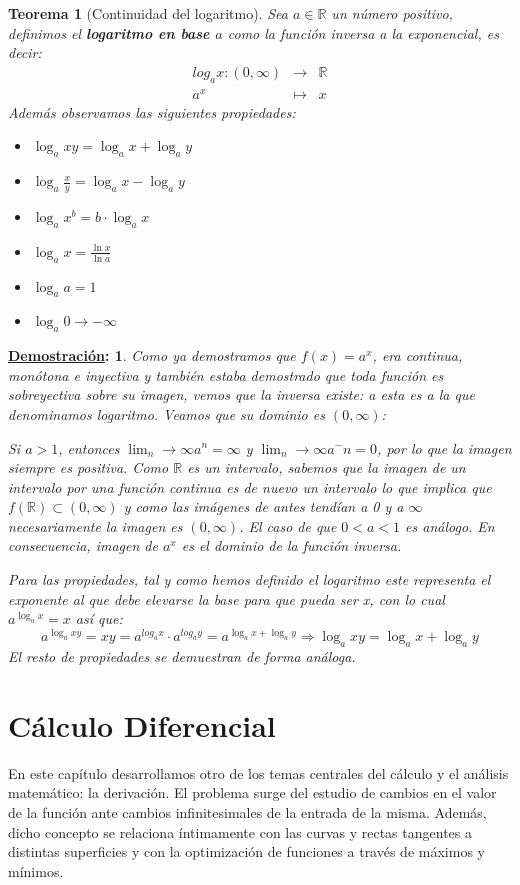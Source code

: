 \documentclass[10pt,a4paper,openright]{book}
\theoremstyle{break}
\newtheorem*{theo}{Teorema}
\newtheorem*{demo}{\underline{Demostración}:}
\begin{document}
\begin{theo}[Continuidad del logaritmo]
Sea $a\in \mathbb{R}$ un número positivo, definimos el \textbf{logaritmo en base $a$} como la función inversa a la exponencial, es decir:
\begin{eqnarray*} log_a x: (0,\infty) &\longrightarrow& \mathbb R \\ a^x &\longmapsto& x \end{eqnarray*}
Además observamos las siguientes propiedades:
\begin{itemize}
\item $\log_a xy = \log_a x + \log_a y$
\item $\log_a \frac{x}{y} = \log_a x - \log_a y$
\item $\log_a x^b = b\cdot \log_a x$
\item $\log_a x = \frac{\ln x}{\ln a}$
\item $\log_a a = 1$
\item $\log_a 0 \rightarrow -\infty$
\end{itemize}
\end{theo}
\begin{demo}
Como ya demostramos que $f(x)=a^x$, era continua, monótona e inyectiva y también estaba demostrado que toda función es sobreyectiva sobre su imagen, vemos que la inversa existe: a esta es a la que denominamos \textit{logaritmo}. Veamos que su dominio es $(0,\infty)$:\par
Si $a>1$, entonces $\lim_n\rightarrow \infty a^n = \infty$ y $\lim_n\rightarrow \infty a^-n = 0$, por lo que la imagen siempre es positiva. Como $\mathbb R$ es un intervalo, sabemos que la imagen de un intervalo por una función continua es de nuevo un intervalo lo que implica que $f(\mathbb R)\subset (0,\infty)$ y como las imágenes de antes tendían a 0 y a $\infty$ necesariamente la imagen es $(0,\infty)$. El caso de que $0<a<1$ es análogo. En consecuencia, imagen de $a^x$ es el dominio de la función inversa.

Para las propiedades, tal y como hemos definido el logaritmo este representa el exponente al que debe elevarse la base para que pueda ser x, con lo cual $a^{\log_a x} = x$ así que:
$$a^{\log_a xy}= xy=a^{log_a x}\cdot a^{log_a y}=a^{\log_a x + \log_a y}\Rightarrow \log_a xy = \log_a x +\log_a y$$
El resto de propiedades se demuestran de forma análoga.
\end{demo}

\chapter{Cálculo Diferencial}
En este capítulo desarrollamos otro de los temas centrales del cálculo y el análisis matemático: la derivación. El problema surge del estudio de cambios en el valor de la función ante cambios infinitesimales de la entrada de la misma. Además, dicho concepto se relaciona íntimamente con las curvas y rectas tangentes a distintas superficies y con la optimización de funciones a través de máximos y mínimos.
\end{document}
